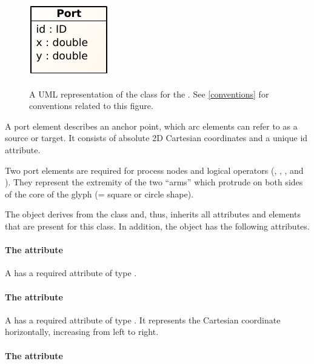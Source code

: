 \begin{figure}[ht!]
  \centering
  \includegraphics[scale=1.0]{figures/sbgnml_port_uml.pdf}\\
\caption{A UML representation of the \Port class for the \SbgnmlPackage.
See \ref{conventions} for conventions related to this figure. }
  \label{fig:sbgnml_port_uml}
\end{figure}

A port element describes an anchor point, which arc elements can refer to as a source or target. It consists of absolute 2D Cartesian coordinates and a unique id attribute.

Two port elements are required for process nodes and logical operators (, , , and ). They represent the extremity of the two ``arms'' which protrude on both sides of the core of the glyph (= square or circle shape).

The \Port object derives from the \SbgnBase class and, thus, inherits all
attributes and elements that are present for this class.
In addition, the \Port object has the following attributes.

\paragraph{The \fixttspace{} attribute}

A \Port has a required attribute  of type .


\paragraph{The \fixttspace{} attribute}

A \Point has a required attribute  of type . It represents the Cartesian  coordinate horizontally, increasing from left to right.


\paragraph{The \fixttspace{} attribute}

